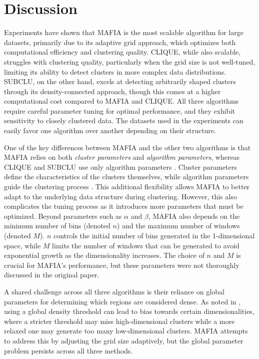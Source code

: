 \section{Discussion}
Experiments have shown that MAFIA is the most scalable algorithm for large datasets, primarily due to its adaptive grid approach, which optimizes both computational efficiency and clustering quality. CLIQUE, while also scalable, struggles with clustering quality, particularly when the grid size is not well-tuned, limiting its ability to detect clusters in more complex data distributions. SUBCLU, on the other hand, excels at detecting arbitrarily shaped clusters through its density-connected approach, though this comes at a higher computational cost compared to MAFIA and CLIQUE. All three algorithms require careful parameter tuning for optimal performance, and they exhibit sensitivity to closely clustered data. The datasets used in the experiments can easily favor one algorithm over another depending on their structure.

One of the key differences between MAFIA and the other two algorithms is that MAFIA relies on both \textit{cluster parameters} and \textit{algorithm parameters}, whereas CLIQUE and SUBCLU use only algorithm parameters \cite[p.~342]{sim-2012}. Cluster parameters define the characteristics of the clusters themselves, while algorithm parameters guide the clustering process . This additional flexibility allows MAFIA to better adapt to the underlying data structure during clustering. However, this also complicates the tuning process as it introduces more parameters that must be optimized. Beyond parameters such as $\alpha$ and $\beta$, MAFIA also depends on the minimum number of bins (denoted $n$) and the maximum number of windows (denoted $M$). $n$ controls the initial number of bins generated in the 1-dimensional space, while $M$ limits the number of windows that can be generated to avoid exponential growth as the dimensionality increases. The choice of $n$ and $M$ is crucial for MAFIA's performance, but these parameters were not thoroughly discussed in the original paper.

A shared challenge across all three algorithms is their reliance on global parameters for determining which regions are considered dense. As noted in \cite[p.1:16]{kriegel-2009}, using a global density threshold can lead to bias towards certain dimensionalities, where a stricter threshold may miss high-dimensional clusters while a more relaxed one may generate too many low-dimensional clusters. MAFIA attempts to address this by adjusting the grid size adaptively, but the global parameter problem persists across all three methods.

